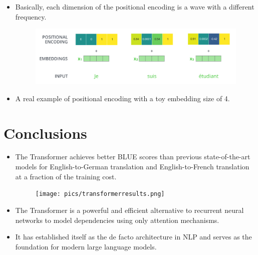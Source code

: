 \begin{itemize}
\item Basically, each dimension of the positional encoding is a wave with a different frequency. 


   \begin{figure}[h]
        	\includegraphics[scale = 0.25]{pics/transformer_positional_encoding_example.png}
        \end{figure}  


\item A real example of positional encoding with a toy embedding size of 4.



\end{itemize}




\section{Conclusions}
\begin{itemize}
 \item The Transformer achieves better BLUE scores than previous state-of-the-art models for English-to-German translation and English-to-French translation at a fraction of the training cost.

      \begin{figure}[h]
        	\texttt{[image: pics/transformerresults.png]}
        \end{figure}  

\item The Transformer is a powerful and efficient alternative to recurrent neural networks to model dependencies using only attention mechanisms.

\item It has established itself as the de facto architecture in NLP and serves as the foundation for modern large language models.
 
\end{itemize}

       
